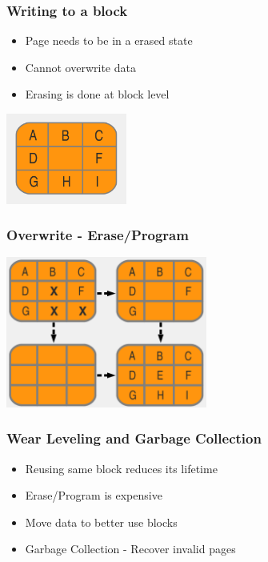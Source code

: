 \documentclass{beamer}
\begin{document}
\begin{frame}
  \frametitle{Writing to a block}
  \begin{itemize}
    \item Page needs to be in a erased state
    \item Cannot overwrite data
    \item Erasing is done at block level
  \end{itemize}
  \begin{center}
  \includegraphics[width=150px]{principles_4.png}
  \end{center}
\end{frame}

\begin{frame}
  \frametitle{Overwrite - Erase/Program}
  \begin{center}
  \includegraphics[width=250px]{principles_5.png}
  \end{center}
\end{frame}

\begin{frame}
  \frametitle{Wear Leveling and Garbage Collection}
  \begin{itemize}
    \item Reusing same block reduces its lifetime
    \item Erase/Program is expensive
    \item Move data to better use blocks
    \item Garbage Collection - Recover invalid pages
  \end{itemize}
\end{frame}
\end{document}
